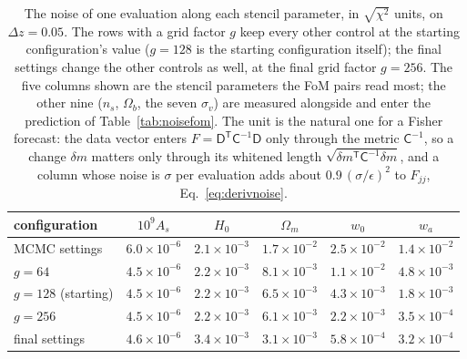 \documentclass[11pt]{article}
\newcommand{\Cov}{\mathsf{C}}
\newcommand{\T}{^{\mathsf{T}}}
\newcommand{\mD}{\mathsf{D}}
\begin{document}
\begin{table}[tbp]
  \centering
  \begin{tabular}{lccccc}
    \hline
    configuration & $10^9 A_s$ & $H_0$ & $\Omega_m$ & $w_0$ & $w_a$ \\
    \hline
    MCMC settings          & $6.0\times10^{-6}$ & $2.1\times10^{-3}$ & $1.7\times10^{-2}$ & $2.5\times10^{-2}$ & $1.4\times10^{-2}$ \\
    $g = 64$               & $4.5\times10^{-6}$ & $2.2\times10^{-3}$ & $8.1\times10^{-3}$ & $1.1\times10^{-2}$ & $4.8\times10^{-3}$ \\
    $g = 128$ (starting)   & $4.5\times10^{-6}$ & $2.2\times10^{-3}$ & $6.5\times10^{-3}$ & $4.3\times10^{-3}$ & $1.8\times10^{-3}$ \\
    $g = 256$              & $4.5\times10^{-6}$ & $2.2\times10^{-3}$ & $6.1\times10^{-3}$ & $2.2\times10^{-3}$ & $3.5\times10^{-4}$ \\
    final settings         & $4.6\times10^{-6}$ & $3.4\times10^{-3}$ & $3.1\times10^{-3}$ & $5.8\times10^{-4}$ & $3.2\times10^{-4}$ \\
    \hline
  \end{tabular}
  \caption{The noise of one evaluation along each stencil parameter,
    in $\sqrt{\chi^2}$ units, on $\Delta z = 0.05$.  The rows with a
    grid factor $g$ keep every other control at the starting
    configuration's value ($g = 128$ is the starting configuration
    itself); the final settings change the other controls as well, at
    the final grid factor $g = 256$.  The five columns shown are the
    stencil parameters the FoM pairs read most; the other nine
    ($n_s$, $\Omega_b$, the seven $\sigma_v$) are measured alongside
    and enter the prediction of Table~\ref{tab:noisefom}.  The unit
    is the natural one for a Fisher forecast: the
    data vector enters $F = \mD\T\Cov^{-1}\mD$ only through the metric
    $\Cov^{-1}$, so a change $\delta m$ matters only through its
    whitened length $\sqrt{\delta m\T\Cov^{-1}\delta m}$, and a column
    whose noise is $\sigma$ per evaluation adds about
    $0.9\,(\sigma/\epsilon)^2$ to $F_{jj}$,
    Eq.~\eqref{eq:derivnoise}.}
  \label{tab:noise}
\end{table}
\end{document}
